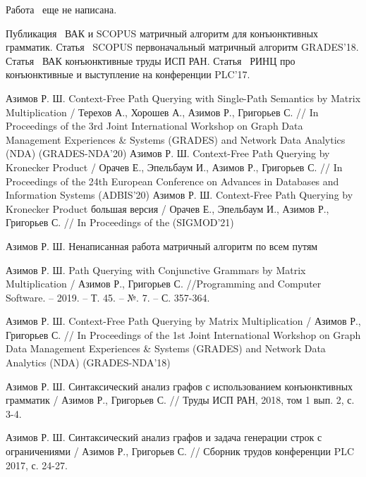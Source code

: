  Работа~\cite{4} еще не написана.
 
 Публикация~\cite{5} ВАК и SCOPUS матричный алгоритм для конъюнктивных грамматик. Статья~\cite{6} SCOPUS первоначальный матричный алгоритм GRADES'18. Статья~\cite{7} ВАК конъюнктивные труды ИСП РАН. Статья~\cite{8} РИНЦ про конъюнктивные и выступление на конференции PLC'17.






\begin{thebibliography}{99}
	 Азимов Р. Ш. Context-Free Path Querying with Single-Path Semantics by
	Matrix Multiplication / Терехов А., Хорошев А., Азимов Р., Григорьев С. // In Proceedings of the
	3rd Joint International Workshop on Graph Data Management Experiences \&
	Systems (GRADES) and Network Data Analytics (NDA) (GRADES-NDA’20)
	 Азимов Р. Ш. Context-Free Path Querying by Kronecker
	Product / Орачев Е., Эпельбаум И., Азимов Р., Григорьев С. // In Proceedings of the
	24th European Conference on Advances in Databases and Information Systems (ADBIS’20)
	 Азимов Р. Ш. Context-Free Path Querying by Kronecker
	Product большая версия / Орачев Е., Эпельбаум И., Азимов Р., Григорьев С. // In Proceedings of the (SIGMOD’21)
	
	 Азимов Р. Ш. Ненаписанная работа матричный алгоритм по всем путям
	
	 Азимов Р. Ш. Path Querying with Conjunctive Grammars by Matrix Multiplication / Азимов Р., Григорьев С. //Programming and Computer Software. – 2019. – Т. 45. – №. 7. – С. 357-364.
	\setcounter{firstbib}{\value{enumiv}}
	
	 Азимов Р. Ш. Context-Free Path Querying by
	Matrix Multiplication / Азимов Р., Григорьев С. // In Proceedings of the
	1st Joint International Workshop on Graph Data Management Experiences \&
	Systems (GRADES) and Network Data Analytics (NDA) (GRADES-NDA’18)
	
	 Азимов Р. Ш. Синтаксический анализ графов с использованием конъюнктивных грамматик / Азимов Р., Григорьев С. // Труды ИСП РАН, 2018, том 1 вып. 2, с. 3-4.
	
	 Азимов Р. Ш. Синтаксический анализ графов и задача генерации строк с ограничениями / Азимов Р., Григорьев С. // Сборник трудов конференции PLC 2017, с. 24-27.
\end{thebibliography}

